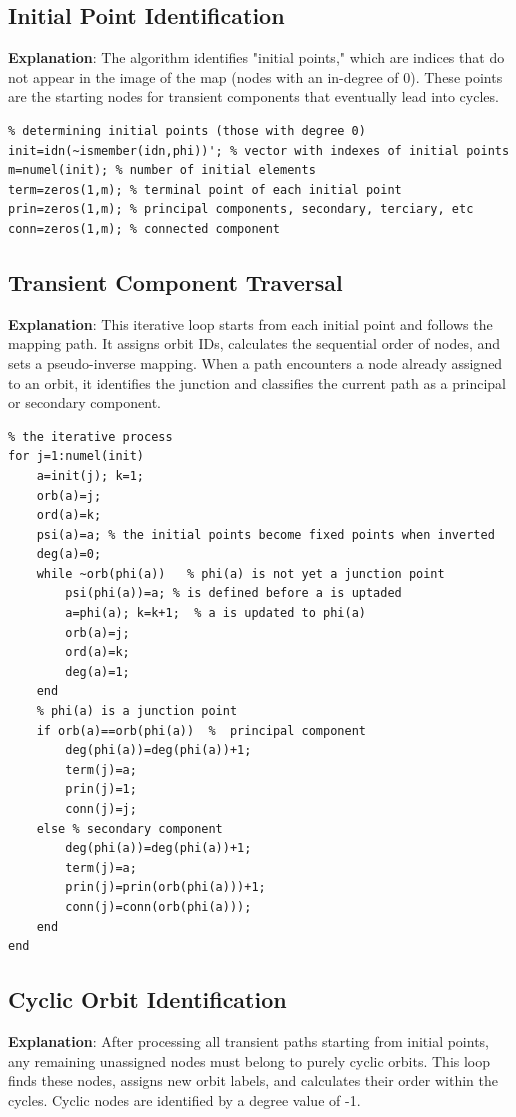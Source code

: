 \subsection{Initial Point Identification}
\textbf{Explanation}: The algorithm identifies "initial points," which are indices that do not appear in the image of the map (nodes with an in-degree of 0). These points are the starting nodes for transient components that eventually lead into cycles.

\begin{lstlisting}
% determining initial points (those with degree 0)
init=idn(~ismember(idn,phi))'; % vector with indexes of initial points
m=numel(init); % number of initial elements
term=zeros(1,m); % terminal point of each initial point
prin=zeros(1,m); % principal components, secondary, terciary, etc
conn=zeros(1,m); % connected component
\end{lstlisting}

\subsection{Transient Component Traversal}
\textbf{Explanation}: This iterative loop starts from each initial point and follows the mapping path. It assigns orbit IDs, calculates the sequential order of nodes, and sets a pseudo-inverse mapping. When a path encounters a node already assigned to an orbit, it identifies the junction and classifies the current path as a principal or secondary component.

\begin{lstlisting}
% the iterative process
for j=1:numel(init)
    a=init(j); k=1;
    orb(a)=j;
    ord(a)=k;
    psi(a)=a; % the initial points become fixed points when inverted
    deg(a)=0;
    while ~orb(phi(a))   % phi(a) is not yet a junction point
        psi(phi(a))=a; % is defined before a is uptaded
        a=phi(a); k=k+1;  % a is updated to phi(a)
        orb(a)=j;
        ord(a)=k;
        deg(a)=1;
    end
    % phi(a) is a junction point
    if orb(a)==orb(phi(a))  %  principal component
        deg(phi(a))=deg(phi(a))+1;
        term(j)=a;
        prin(j)=1;
        conn(j)=j;  
    else % secondary component
        deg(phi(a))=deg(phi(a))+1;
        term(j)=a; 
        prin(j)=prin(orb(phi(a)))+1;
        conn(j)=conn(orb(phi(a)));
    end
end
\end{lstlisting}

\subsection{Cyclic Orbit Identification}
\textbf{Explanation}: After processing all transient paths starting from initial points, any remaining unassigned nodes must belong to purely cyclic orbits. This loop finds these nodes, assigns new orbit labels, and calculates their order within the cycles. Cyclic nodes are identified by a degree value of -1.

